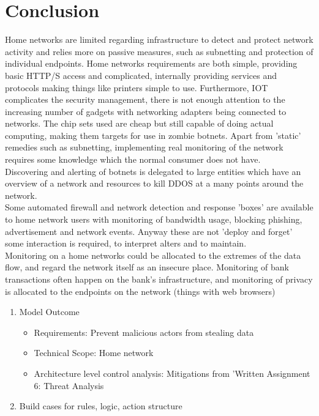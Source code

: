 \documentclass[
	letterpaper, %
	10pt, %
	unnumberedsections, %
	twoside, %
]{APAAssignment}
\begin{document}
\section{Conclusion}
Home networks are limited regarding infrastructure to detect and protect network activity and relies more on passive measures, such as subnetting and protection of individual endpoints. Home networks requirements are both simple, providing basic HTTP/S access and complicated, internally providing services and protocols making things like printers simple to use. Furthermore, IOT complicates the security management, there is not enough attention to the increasing number of gadgets with networking adapters being connected to networks. The chip sets used are cheap but still capable of doing actual computing, making them targets for use in zombie botnets.
Apart from 'static' remedies such as subnetting, implementing real monitoring of the network requires some knowledge which the normal consumer does not have. \\
Discovering and alerting of botnets is delegated to large entities which have an overview of a network and resources to kill DDOS at a many points around the network. \\
Some automated firewall and network detection and response 'boxes'\cite{FireWallaCommerical} are available to home network users with monitoring of bandwidth usage, blocking phishing, advertisement and network events. Anyway these are not 'deploy and forget' some interaction is required, to interpret alters and to maintain. \\
Monitoring on a home networks could be allocated to the extremes of the data flow, and regard the network itself as an insecure place. Monitoring of bank transactions often happen on the bank's infrastructure, and monitoring of privacy is allocated to the endpoints on the network (things with web browsers)














\begin{enumerate}
	\item Model Outcome
	      \begin{itemize}
		      \item Requirements: Prevent malicious actors from stealing data
		      \item Technical Scope: Home network
		      \item Architecture level control analysis: Mitigations from 'Written Assignment 6: Threat Analysis
	      \end{itemize}

	\item Build cases for rules, logic, action structure


\end{enumerate}
\end{document}
